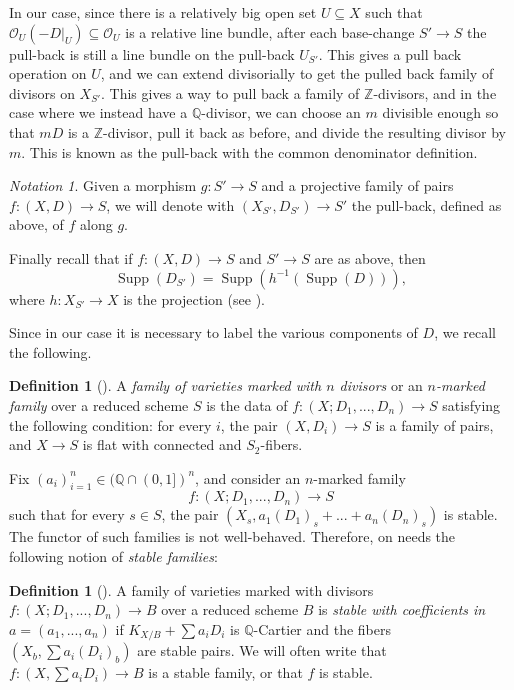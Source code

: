 \documentclass[11pt]{amsart}
\theoremstyle{definition}
\newtheorem{definition}[theorem]{Definition}
\theoremstyle{remark}
\newtheorem{notation}[theorem]{Notation}
\newcommand{\calO}{\mathcal O}
\newcommand{\Supp}{\operatorname{Supp}}
\begin{document}
	
	In our case, since there is a relatively big open set $U \subseteq X$ such that $\calO_U(-D|_U) \subseteq \calO_U$ is a relative line bundle, after each base-change $S' \to S$ the pull-back is still a line bundle on the pull-back $U_{S'}$.
	This gives a pull back operation on $U$, and we can extend divisorially to get the pulled back family of divisors on $X_{S'}$.
	This gives a way to pull back a family of $\mathbb{Z}$-divisors, and
	in the case where we instead have a $\mathbb{Q}$-divisor, we can choose an $m$ divisible enough so that $mD$ is a $\mathbb{Z}$-divisor, pull it back as before, and divide the resulting divisor by $m$. This is known as the pull-back with the common denominator definition.
	\begin{notation}
		Given a morphism $g:S' \to S$ and a projective family of pairs $f:(X,D) \to S$, we will denote with $(X_{S'},D_{S'}) \to S'$ the pull-back, defined as above, of $f$ along $g$.
	\end{notation}
	Finally recall that if $f:(X,D) \to S$ and $S' \to S$ are as above, then \[\Supp(D_{S'})=\Supp(h^{-1}(\Supp(D))),\] where $h:X_{S'} \to X$ is the projection (see \cite[Chapter 4]{kollarmodulibook}).
	
	Since in our case it is necessary to label the various components of $D$, we recall the following.
	\begin{definition}[{\cite[Section 4]{kollarmodulibook}}]
		\label{def:stable_family}
		A \emph{family of varieties marked with $n$ divisors} or an \emph{$n$-marked family} over a reduced scheme $S$ is the data of $f:(X;D_1,...,D_n) \to S$ satisfying the following condition: for every $i$, the pair $(X,D_i) \to S$ is a family of pairs, and $X \to S$ is flat with connected and $S_2$-fibers.
	\end{definition}
	Fix $(a_i)_{i=1}^n \in (\mathbb{Q} \cap (0,1])^n$, and consider an $n$-marked family $$f:(X;D_1,...,D_n) \to S$$ such that for every $s \in S$, the pair $(X_s,a_1(D_1)_s+...+a_n(D_n)_s)$ is stable. The functor of such families is not well-behaved. Therefore,
	on needs the following notion of \emph{stable families}:
	
	\begin{definition}
		[{\cite[Definition-Theorem 4.45 and 4.70.3]{kollarmodulibook}}]\label{def:marking}
		A family of varieties marked with divisors $f:(X;D_1,...,D_n) \to B$ over a reduced scheme $B$ is \emph{stable with coefficients in} $a=(a_1,...,a_n)$ if $K_{X/B}+\sum a_iD_i $ is $\mathbb{Q}$-Cartier and the fibers $\left(X_b,\sum a_i(D_i)_b\right)$ are stable pairs. We will often write that $f:(X, \sum a_iD_i) \to B$ is a stable family, or that $f$ is stable.
	\end{definition}
	
\end{document}
